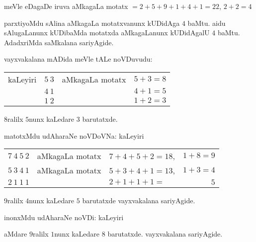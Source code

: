 \smallskip

\smallskip

meVle eDagaDe iruva aMkagaLa motatx $=2+5+9+1+4+1=22$, $2+2=4$

parxtiyoMdu sAlina aMkagaLa motatxvanunx kUDidAga $4$ baMtu. aidu sAlugaLanunx kUDibaMda motatxda aMkagaLanunx kUDidAgalU $4$ baMtu. AdadxriMda saMkalana sariyAgide.

vayxvakalana mADida meVle tALe noVDuvudu:

\smallskip

\begin{tabular}{lcll}
kaLeyiri & $5~3$ & aMkagaLa motatx & $5+3=8$\\
& $4~1$ & & $4+1=5$\\\cline{2-2}\cline{4-4}
& $1~2$ & & $1+2 =3$
\end{tabular}

\smallskip

$8$ralilx $5$nunx kaLedare $3$ barutatxde. 

matotxMdu udAharaNe noVDoVNa: kaLeyiri

\smallskip

\begin{tabular}{lclr}
$7~4~5~2$ & aMkagaLa motatx & $7+4+5+2=18$, & $1+8=9$ \\
$5~3~4~1$ & aMkagaLa motatx & $5+3+4+1=13$, & $1+3=4$\\\cline{1-1}\cline{3-3}\cline{4-4}
$2~1~1~1$ & & $2+1+1+1 =$  & $5$
\end{tabular}

\smallskip

$9$ralilx $4$nunx kaLedare $5$ barutatxde vayxvakalana sariyAgide.

inonxMdu udAharaNe noVDi: kaLeyiri

\smallskip

{\fontsize{11}{13}}

\smallskip

aMdare $9$ralilx $1$nunx kaLedare $8$ barutatxde. vayxvakalana sariyAgide.
